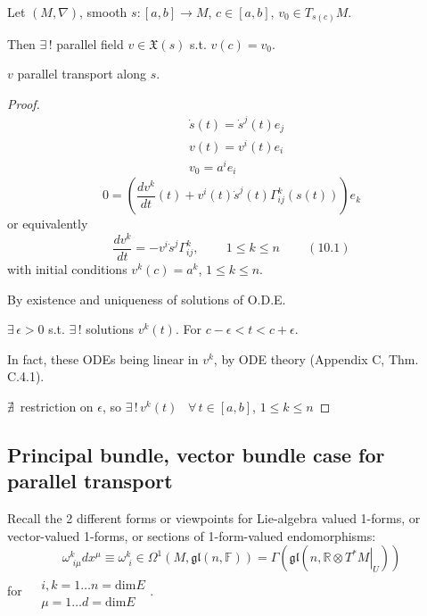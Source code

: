 \begin{theorem}[10.1.13] 
Let $(M,\nabla)$, smooth $s:[a,b]\to M$, $c\in [a,b]$, $v_0 \in T_{s(c)}M$.  

Then $\exists \, !$ parallel field $v\in \mathfrak{X}(s)$ s.t. $v(c) = v_0$.  

$v$ parallel transport along $s$.  
\end{theorem}
\begin{proof}
	\[
\begin{aligned}
	& \dot{s}(t) = \dot{s}^j(t) e_j \\ 
	&  v(t) = v^i(t) e_i  \\
& v_0 = a^i e_i
\end{aligned}
\]
\[
0 = \left( \frac{dv^k}{dt}(t) + v^i(t) \dot{s}^j(t) \Gamma^k_{ij}(s(t)) \right) e_k
\]
or equivalently
\begin{equation}
	\frac{dv^k}{dt} = - v^i \dot{s}^j \Gamma^k_{ij} , \qquad \, 1\leq k \leq n \qquad \, (10.1)
\end{equation}
with initial conditions $v^k(c) = a^k$, $1\leq k \leq n$.  

By existence and uniqueness of solutions of O.D.E.  

$\exists \, \epsilon > 0$ s.t. $\exists \, !$ solutions $v^k(t)$.  For $c-\epsilon < t < c+\epsilon$.  

In fact, these ODEs being linear in $v^k$,  by ODE theory (Appendix C, Thm. C.4.1).  

$\nexists \, $ restriction on $\epsilon$, so $\exists \, ! \, v^k(t)$ \, $\forall \, t \in [a,b]$, $1\leq k \leq n$  

\end{proof}




\subsection{Principal bundle, vector bundle case for parallel transport}  

Recall the 2 different forms or viewpoints for Lie-algebra valued 1-forms, or vector-valued 1-forms, or sections of 1-form-valued endomorphisms:
\[
\omega^k_{ \,\, i\mu} dx^{\mu} \equiv \omega^k_{\,\,i} \in \Omega^1(M,\mathfrak{gl}(n,\mathbb{F})) = \Gamma(\mathfrak{gl}(n,\mathbb{R} \otimes \left. T^* M \right|_U ) )
\] 
for $\begin{aligned} & \quad \\
	& i,k = 1\dots n =\text{dim}E \\ 
	& \mu = 1\dots d =\text{dim}E \end{aligned}$.  


